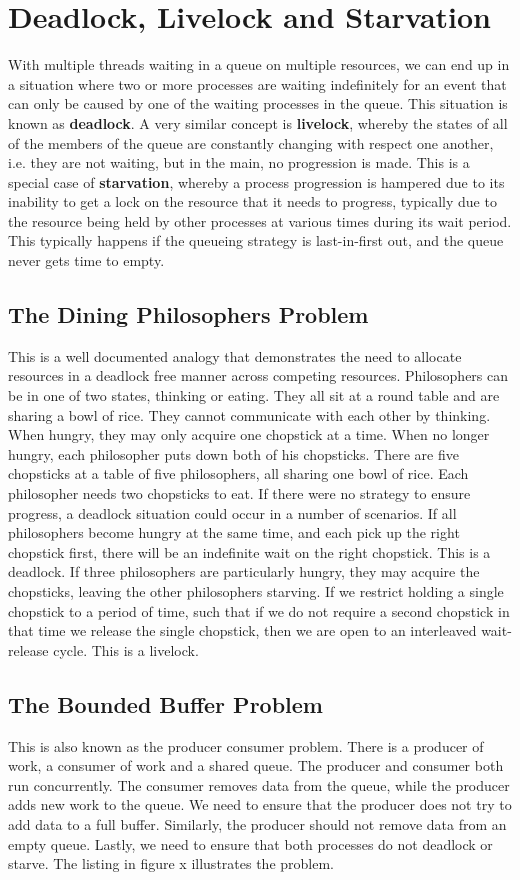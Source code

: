 \documentclass[10pt,a4paper]{article}
\begin{document}
\section{Deadlock, Livelock and Starvation}
With multiple threads waiting in a queue on multiple resources, we can end up in a situation where two or more processes are waiting indefinitely for an event that can only be caused by one of the waiting processes in the queue. This situation is known as {\bf deadlock}. A very similar concept is {\bf livelock}, whereby the states of all of the members of the queue are constantly changing with respect one another, i.e. they are not waiting, but in the main, no progression is made. This is a special case of {\bf starvation}, whereby a process progression is hampered due to its inability to get a lock on the resource that it needs to progress, typically due to the resource being held by other processes at various times during its wait period. This typically happens if the queueing strategy is last-in-first out, and the queue never gets time to empty. 
\subsection{The Dining Philosophers Problem}
This is a well documented analogy that demonstrates the need to allocate resources in a deadlock free manner across competing resources. Philosophers  can be in one of two states, thinking or eating. They all sit at a round table and are sharing a bowl of rice. They cannot communicate with each other by thinking. When hungry, they may only acquire one chopstick at a time. When no longer hungry, each philosopher puts down both of his chopsticks. There are five chopsticks at a table of five philosophers, all sharing one bowl of rice. Each philosopher needs two chopsticks to eat. If there were no strategy to ensure progress, a deadlock situation could occur in a number of scenarios. If all philosophers become hungry at the same time, and each pick up the right chopstick first, there will be an indefinite wait on the right chopstick. This is a deadlock. If three philosophers are particularly hungry, they may acquire the chopsticks, leaving the other philosophers starving. If we restrict holding a single chopstick to a period of time, such that if we do not require a second chopstick in that time we release the single chopstick, then we are open to an interleaved wait-release cycle. This is a livelock. 
\subsection{The Bounded Buffer Problem}
This is also known as the producer consumer problem. There is a producer of work, a consumer of work and a shared queue. The producer and consumer both run concurrently. The consumer removes data from the queue, while the producer adds new work to the queue. We need to ensure that the producer does not try to add data to a full buffer. Similarly, the producer should not remove data from an empty queue. Lastly, we need to ensure that both processes do not deadlock or starve. The listing in figure x illustrates the problem. 
\end{document}
